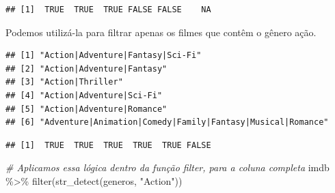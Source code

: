 \documentclass[
]{book}
\newenvironment{Shaded}{\begin{snugshade}}{\end{snugshade}}
\newcommand{\AttributeTok}[1]{\textcolor[rgb]{0.77,0.63,0.00}{#1}}
\newcommand{\CommentTok}[1]{\textcolor[rgb]{0.56,0.35,0.01}{\textit{#1}}}
\newcommand{\DecValTok}[1]{\textcolor[rgb]{0.00,0.00,0.81}{#1}}
\newcommand{\FunctionTok}[1]{\textcolor[rgb]{0.00,0.00,0.00}{#1}}
\newcommand{\NormalTok}[1]{#1}
\newcommand{\SpecialCharTok}[1]{\textcolor[rgb]{0.00,0.00,0.00}{#1}}
\newcommand{\StringTok}[1]{\textcolor[rgb]{0.31,0.60,0.02}{#1}}
\begin{document}
\begin{verbatim}
## [1]  TRUE  TRUE  TRUE FALSE FALSE    NA
\end{verbatim}

Podemos utilizá-la para filtrar apenas os filmes que contêm o gênero ação.

\begin{Shaded}
\end{Shaded}

\begin{verbatim}
## [1] "Action|Adventure|Fantasy|Sci-Fi"                          
## [2] "Action|Adventure|Fantasy"                                 
## [3] "Action|Thriller"                                          
## [4] "Action|Adventure|Sci-Fi"                                  
## [5] "Action|Adventure|Romance"                                 
## [6] "Adventure|Animation|Comedy|Family|Fantasy|Musical|Romance"
\end{verbatim}

\begin{Shaded}
\end{Shaded}

\begin{verbatim}
## [1]  TRUE  TRUE  TRUE  TRUE  TRUE FALSE
\end{verbatim}

\begin{Shaded}
\begin{Highlighting}[]
\CommentTok{\# Aplicamos essa lógica dentro da função filter, para a coluna completa}
\NormalTok{imdb }\SpecialCharTok{\%\textgreater{}\%} \FunctionTok{filter}\NormalTok{(}\FunctionTok{str\_detect}\NormalTok{(generos, }\StringTok{"Action"}\NormalTok{))}
\end{Highlighting}
\end{Shaded}
\end{document}
